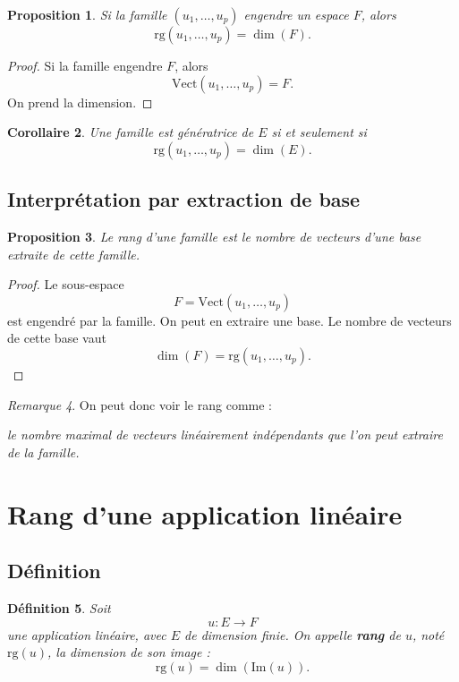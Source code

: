 \documentclass[11pt,a4paper]{article}
\newtheorem{definition}{Définition}[section]
\newtheorem{proposition}[definition]{Proposition}
\newtheorem{corollaire}[definition]{Corollaire}
\theoremstyle{remark}
\newtheorem{remarque}[definition]{Remarque}
\newcommand{\Vect}{\mathrm{Vect}}
\newcommand{\Img}{\mathrm{Im}}
\newcommand{\rg}{\mathrm{rg}}
\begin{document}
\begin{proposition}
Si la famille \((u_1,\dots,u_p)\) engendre un espace \(F\), alors
\[
\rg(u_1,\dots,u_p)=\dim(F).
\]
\end{proposition}

\begin{proof}
Si la famille engendre \(F\), alors
\[
\Vect(u_1,\dots,u_p)=F.
\]
On prend la dimension.
\end{proof}

\begin{corollaire}
Une famille est génératrice de \(E\) si et seulement si
\[
\rg(u_1,\dots,u_p)=\dim(E).
\]
\end{corollaire}

\subsection{Interprétation par extraction de base}

\begin{proposition}
Le rang d’une famille est le nombre de vecteurs d’une base extraite de cette famille.
\end{proposition}

\begin{proof}
Le sous-espace
\[
F=\Vect(u_1,\dots,u_p)
\]
est engendré par la famille. On peut en extraire une base. Le nombre de vecteurs de cette base vaut
\[
\dim(F)=\rg(u_1,\dots,u_p).
\]
\end{proof}

\begin{remarque}
On peut donc voir le rang comme :
\begin{center}
\textit{le nombre maximal de vecteurs linéairement indépendants que l’on peut extraire de la famille.}
\end{center}
\end{remarque}

\section{Rang d’une application linéaire}

\subsection{Définition}

\begin{definition}
Soit
\[
u:E\to F
\]
une application linéaire, avec \(E\) de dimension finie.  
On appelle \textbf{rang} de \(u\), noté \(\rg(u)\), la dimension de son image :
\[
\rg(u)=\dim(\Img(u)).
\]
\end{definition}
\end{document}
